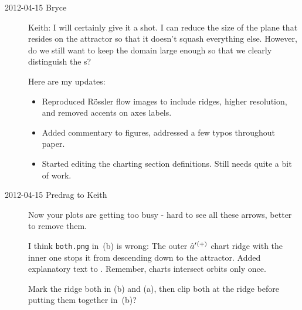 \begin{description}
\item[2012-04-15 Bryce]

Keith: I will certainly give it a shot. I can reduce the size of the
plane that resides on the attractor so that it doesn't squash everything
else. However, do we still want to keep the domain large enough so that
we clearly distinguish the \poincBord s?

Here are my updates:
  	\begin{itemize}
  	\item Reproduced R\"ossler flow images to include ridges, higher
          resolution, and removed accents on axes labels.
  	\item Added commentary to figures, addressed a few typos throughout paper.
  	\item Started editing the charting section definitions. Still needs quite a bit of work.
  	\end{itemize}

\item[2012-04-15 Predrag to Keith] Now your plots are getting too busy -
hard to see all these arrows, better to remove them.

I think
\texttt{both.png} in \,(b) is wrong: The outer
$\hat{a}'{}^{(+)}$ chart ridge with the inner one stops it from descending
down to the attractor. Added explanatory text to .
Remember, charts intersect orbits only once.

Mark the ridge both in (b) and
(a), then clip both at the ridge before putting them
together in \,(b)?
	
\end{description}
